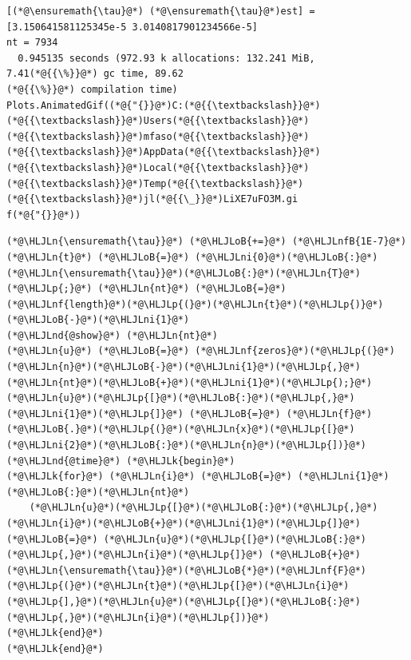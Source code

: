 \documentclass[12pt,a4paper]{article}
\newcommand{\HLJLk}[1]{\textcolor[RGB]{148,91,176}{\textbf{#1}}}
\newcommand{\HLJLn}[1]{#1}
\newcommand{\HLJLnd}[1]{\textcolor[RGB]{214,102,97}{#1}}
\newcommand{\HLJLnf}[1]{\textcolor[RGB]{66,102,213}{#1}}
\newcommand{\HLJLnfB}[1]{\textcolor[RGB]{59,151,46}{#1}}
\newcommand{\HLJLni}[1]{\textcolor[RGB]{59,151,46}{#1}}
\newcommand{\HLJLoB}[1]{\textcolor[RGB]{102,102,102}{\textbf{#1}}}
\newcommand{\HLJLp}[1]{#1}
\begin{document}
\begin{lstlisting}
[(*@\ensuremath{\tau}@*) (*@\ensuremath{\tau}@*)est] = [3.150641581125345e-5 3.0140817901234566e-5]
nt = 7934
  0.945135 seconds (972.93 k allocations: 132.241 MiB, 7.41(*@{{\%}}@*) gc time, 89.62
(*@{{\%}}@*) compilation time)
Plots.AnimatedGif((*@{"{}}@*)C:(*@{{\textbackslash}}@*)(*@{{\textbackslash}}@*)Users(*@{{\textbackslash}}@*)(*@{{\textbackslash}}@*)mfaso(*@{{\textbackslash}}@*)(*@{{\textbackslash}}@*)AppData(*@{{\textbackslash}}@*)(*@{{\textbackslash}}@*)Local(*@{{\textbackslash}}@*)(*@{{\textbackslash}}@*)Temp(*@{{\textbackslash}}@*)(*@{{\textbackslash}}@*)jl(*@{{\_}}@*)LiXE7uFO3M.gi
f(*@{"{}}@*))
\end{lstlisting}


\begin{lstlisting}
(*@\HLJLn{\ensuremath{\tau}}@*) (*@\HLJLoB{+=}@*) (*@\HLJLnfB{1E-7}@*)
(*@\HLJLn{t}@*) (*@\HLJLoB{=}@*) (*@\HLJLni{0}@*)(*@\HLJLoB{:}@*)(*@\HLJLn{\ensuremath{\tau}}@*)(*@\HLJLoB{:}@*)(*@\HLJLn{T}@*)(*@\HLJLp{;}@*) (*@\HLJLn{nt}@*) (*@\HLJLoB{=}@*) (*@\HLJLnf{length}@*)(*@\HLJLp{(}@*)(*@\HLJLn{t}@*)(*@\HLJLp{)}@*)(*@\HLJLoB{-}@*)(*@\HLJLni{1}@*)
(*@\HLJLnd{@show}@*) (*@\HLJLn{nt}@*)
(*@\HLJLn{u}@*) (*@\HLJLoB{=}@*) (*@\HLJLnf{zeros}@*)(*@\HLJLp{(}@*)(*@\HLJLn{n}@*)(*@\HLJLoB{-}@*)(*@\HLJLni{1}@*)(*@\HLJLp{,}@*)(*@\HLJLn{nt}@*)(*@\HLJLoB{+}@*)(*@\HLJLni{1}@*)(*@\HLJLp{);}@*) (*@\HLJLn{u}@*)(*@\HLJLp{[}@*)(*@\HLJLoB{:}@*)(*@\HLJLp{,}@*)(*@\HLJLni{1}@*)(*@\HLJLp{]}@*) (*@\HLJLoB{=}@*) (*@\HLJLn{f}@*)(*@\HLJLoB{.}@*)(*@\HLJLp{(}@*)(*@\HLJLn{x}@*)(*@\HLJLp{[}@*)(*@\HLJLni{2}@*)(*@\HLJLoB{:}@*)(*@\HLJLn{n}@*)(*@\HLJLp{])}@*)
(*@\HLJLnd{@time}@*) (*@\HLJLk{begin}@*)
(*@\HLJLk{for}@*) (*@\HLJLn{i}@*) (*@\HLJLoB{=}@*) (*@\HLJLni{1}@*)(*@\HLJLoB{:}@*)(*@\HLJLn{nt}@*)
    (*@\HLJLn{u}@*)(*@\HLJLp{[}@*)(*@\HLJLoB{:}@*)(*@\HLJLp{,}@*)(*@\HLJLn{i}@*)(*@\HLJLoB{+}@*)(*@\HLJLni{1}@*)(*@\HLJLp{]}@*) (*@\HLJLoB{=}@*) (*@\HLJLn{u}@*)(*@\HLJLp{[}@*)(*@\HLJLoB{:}@*)(*@\HLJLp{,}@*)(*@\HLJLn{i}@*)(*@\HLJLp{]}@*) (*@\HLJLoB{+}@*) (*@\HLJLn{\ensuremath{\tau}}@*)(*@\HLJLoB{*}@*)(*@\HLJLnf{F}@*)(*@\HLJLp{(}@*)(*@\HLJLn{t}@*)(*@\HLJLp{[}@*)(*@\HLJLn{i}@*)(*@\HLJLp{],}@*)(*@\HLJLn{u}@*)(*@\HLJLp{[}@*)(*@\HLJLoB{:}@*)(*@\HLJLp{,}@*)(*@\HLJLn{i}@*)(*@\HLJLp{])}@*)
(*@\HLJLk{end}@*)
(*@\HLJLk{end}@*)


\end{lstlisting}
\end{document}
